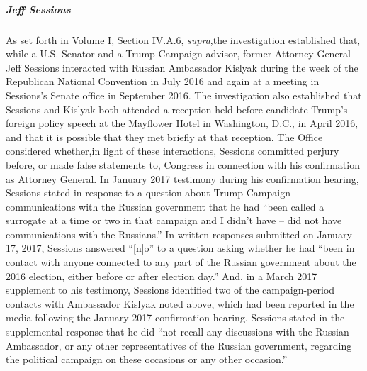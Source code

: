 

\subparagraph{Jeff Sessions}
As set forth in Volume I, Section IV.A.6, \textit{supra},the investigation established that, while a U.S. Senator and a Trump Campaign advisor, former Attorney General Jeff Sessions interacted with Russian Ambassador Kislyak during the week of the Republican National Convention in July 2016 and again at a meeting in Sessions's Senate office in September 2016.
The investigation also established that Sessions and Kislyak both attended a reception held before candidate Trump's foreign policy speech at the Mayflower Hotel in Washington, D.C., in April 2016, and that it is possible that they met briefly at that reception.
The Office considered whether,in light of these interactions, Sessions committed perjury before, or made false statements to, Congress in connection with his confirmation as Attorney General.
In January 2017 testimony during his confirmation hearing, Sessions stated in response to a question about Trump Campaign communications with the Russian government that he had ``been called a surrogate at a time or two in that campaign and I didn't have -- did not have communications with the Russians.''
In written responses submitted on January 17, 2017, Sessions answered ``[n]o'' to a question asking whether he had ``been in contact with anyone connected to any part of the Russian government about the 2016 election, either before or after election day.''
And, in a March 2017 supplement to his testimony, Sessions identified two of the campaign-period contacts with Ambassador Kislyak noted above, which had been reported in the media following the January 2017 confirmation hearing.
Sessions stated in the supplemental response that he did ``not recall any discussions with the Russian Ambassador, or any other representatives of the Russian government, regarding the political campaign on these occasions or any other occasion.''

